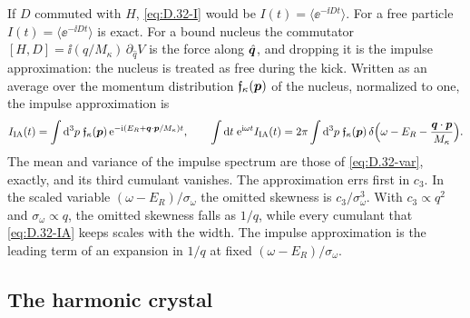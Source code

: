If $D$ commuted with $H$, \cref{eq:D.32-I} would be $I(t) = \langle\ee^{-\ii Dt}\rangle$. For a free particle $I(t) = \langle\ee^{-\ii Dt}\rangle$ is exact. For a bound nucleus the commutator $[H, D] = \ii(q/M_\kappa)\,\partial_{\hat q}V$ is the force along $\hat{\bm{q}}$, and dropping it is the impulse approximation: the nucleus is treated as free during the kick. Written as an average over the momentum distribution $\mathfrak{f}_\kappa(\bm{p})$ of the nucleus, normalized to one, the impulse approximation is
\begin{equation}
  I_{\mathrm{IA}}(t) = \int\mathrm{d}^3p\;\mathfrak{f}_\kappa(\bm{p})\,\mathrm{e}^{-\mathrm{i}(E_R + \bm{q}\cdot\bm{p}/M_\kappa)t} , \qquad
  \int\mathrm{d} t\;\mathrm{e}^{\mathrm{i}\omega t}I_{\mathrm{IA}}(t) = 2\pi\int\mathrm{d}^3p\;\mathfrak{f}_\kappa(\bm{p})\,\delta\Bigl(\omega - E_R - \frac{\bm{q}\cdot\bm{p}}{M_\kappa}\Bigr) .
  \label{eq:D.32-IA}
\end{equation}
The mean and variance of the impulse spectrum are those of \cref{eq:D.32-var}, exactly, and its third cumulant vanishes. The approximation errs first in $c_3$. In the scaled variable $(\omega - E_R)/\sigma_\omega$ the omitted skewness is $c_3/\sigma_\omega^3$. With $c_3 \propto q^2$ and $\sigma_\omega \propto q$, the omitted skewness falls as $1/q$, while every cumulant that \cref{eq:D.32-IA} keeps scales with the width. The impulse approximation is the leading term of an expansion in $1/q$ at fixed $(\omega - E_R)/\sigma_\omega$.

\subsection{The harmonic crystal}

